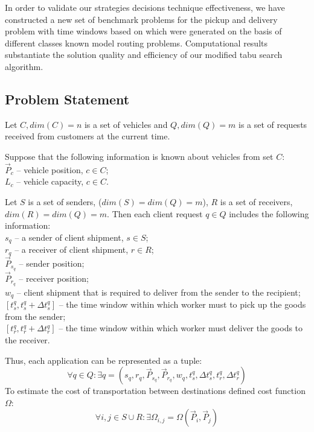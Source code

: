 \documentclass[]{TAACpaper}
\begin{document}
In order to validate our strategies decisions technique effectiveness, we have constructed a new set of benchmark problems for the pickup and delivery problem with time windows based on which were generated on the basis of different classes known model routing problems. Computational results substantiate the solution quality and efficiency of our modified tabu search algorithm.
 

\subsection{Problem Statement}
Let $C,dim(C)=n$ is a set of vehicles and $Q,dim(Q)=m$ is a set of requests received from customers at the current time.

Suppose that the following information is known about vehicles from set $C$: \\
$\vec{P}_c$ -- vehicle position, $c \in C$;\\
$L_c$ -- vehicle capacity, $c \in C$.

Let $S$ is a set of senders, ($dim(S) = dim(Q) = m$), $R$ is a set of receivers, $dim(R) = dim(Q) = m$. Then each client request $q \in Q$ includes the following information:\\
$s_q$ -- a sender of client shipment, $s \in S$; \\
$r_q$ -- a receiver of client shipment, $r \in R$; \\
$\vec{P}_{s_q}$ -- sender position;\\
$\vec{P}_{r_q}$ -- receiver position; \\
$w_q$ -- client shipment that is required to deliver from the sender to the recipient; \\
$[t_{s}^{q}, t_{s}^{q}+ \Delta{t_{s}^{q}}]$ -- the time window within which worker must to pick up the goods from the sender;\\ 
$[t_{r}^{q}, t_{r}^{q}+ \Delta{t_{r}^{q}}]$ -- the time window within which worker must deliver the goods to the receiver.
 
Thus, each application can be represented as a tuple:
\begin{equation}
\forall q \in Q: \exists q = (s_q,r_q, \vec{P}_{s_q}, \vec{P}_{r_q}, w_q, t_{s}^{q}, \Delta{t_{s}^{q}}, t_{r}^{q}, \Delta{t_{r}^{q}})
\end{equation}
To estimate the cost of transportation between destinations defined cost function $\Omega$:
\begin{equation}
\forall i,j \in S \cup R: \exists \Omega_{i,j} = \Omega(\vec{P}_i,\vec{P}_j)
\end{equation}
\end{document}
